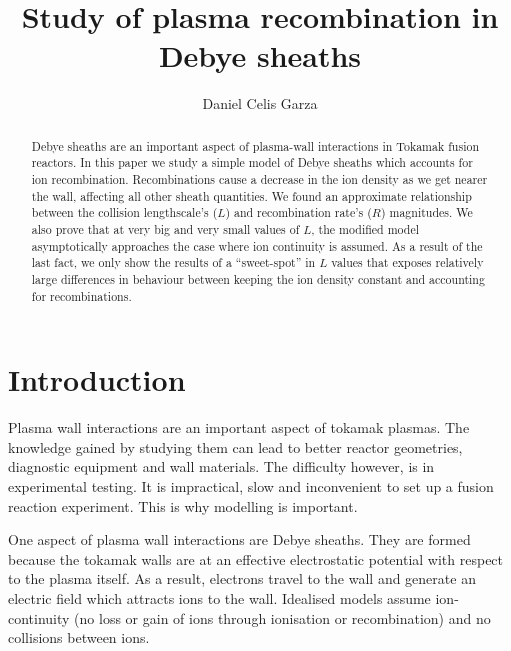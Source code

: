\documentclass[aip,apl,reprint]{revtex4-1}
\begin{document}
	\title{Study of plasma recombination in Debye sheaths}
	\author{Daniel Celis Garza}
	\begin{abstract}
		Debye sheaths are an important aspect of plasma-wall interactions in Tokamak fusion reactors. In this paper we study a simple model of Debye sheaths which accounts for ion recombination. Recombinations cause a decrease in the ion density as we get nearer the wall, affecting all other sheath quantities. We found an approximate relationship between the collision lengthscale's ($L$) and recombination rate's ($R$) magnitudes. We also prove that at very big and very small values of $L$, the modified model asymptotically approaches the case where ion continuity is assumed. As a result of the last fact, we only show the results of a ``sweet-spot'' in $L$ values that exposes relatively large differences in behaviour between keeping the ion density constant and accounting for recombinations.

	\end{abstract}
	\maketitle
	
	\section{Introduction}
	Plasma wall interactions are an important aspect of tokamak plasmas. The knowledge gained by studying them can lead to better reactor geometries, diagnostic equipment and wall materials. The difficulty however, is in experimental testing. It is impractical, slow and inconvenient to set up a fusion reaction experiment. This is why modelling is important.
	
	One aspect of plasma wall interactions are Debye sheaths. They are formed because the tokamak walls are at an effective electrostatic potential with respect to the plasma itself. As a result, electrons travel to the wall and generate an electric field which attracts ions to the wall. Idealised models assume ion-continuity (no loss or gain of ions through ionisation or recombination) and no collisions between ions. 
	
\end{document}
